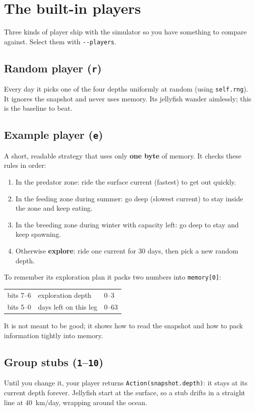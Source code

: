 \documentclass[11pt]{article}
\begin{document}
\section{The built-in players}

Three kinds of player ship with the simulator so you have something to
compare against. Select them with \texttt{-{}-players}.

\subsection{Random player (\texttt{r})}
Every day it picks one of the four depths uniformly at random (using
\texttt{self.rng}). It ignores the snapshot and never uses memory.
Its jellyfish wander aimlessly; this is the baseline to beat.

\subsection{Example player (\texttt{e})}
A short, readable strategy that uses only \textbf{one byte} of memory.
It checks these rules in order:
\begin{enumerate}[leftmargin=*]
  \item In the predator zone: ride the surface current (fastest) to get
  out quickly.
  \item In the feeding zone during summer: go deep (slowest current) to
  stay inside the zone and keep eating.
  \item In the breeding zone during winter with capacity left: go deep to
  stay and keep spawning.
  \item Otherwise \textbf{explore}: ride one current for 30 days, then
  pick a new random depth.
\end{enumerate}
To remember its exploration plan it packs two numbers into
\texttt{memory[0]}:
\begin{center}
\begin{tabular}{@{}lll@{}}
\toprule
bits 7--6 & exploration depth & 0--3 \\
bits 5--0 & days left on this leg & 0--63 \\
\bottomrule
\end{tabular}
\end{center}
It is not meant to be good; it shows how to read the snapshot and how to
pack information tightly into memory.

\subsection{Group stubs (\texttt{1}--\texttt{10})}
Until you change it, your player returns \texttt{Action(snapshot.depth)}:
it stays at its current depth forever. Jellyfish start at the surface, so
a stub drifts in a straight line at 40~km/day, wrapping around the ocean.
\end{document}
